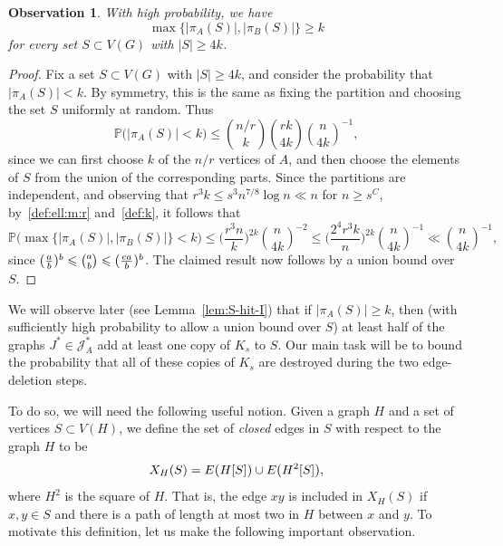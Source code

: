 \documentclass[10pt,a4paper]{amsart}
\newcommand\pig[1]{\scalerel*[5pt]{\normalsize#1}{%
  \ensurestackMath{\addstackgap[0.5pt]{\normalsize#1}}}}
\newtheorem{observation}[theorem]{Observation}
\numberwithin{theorem}{section}
\renewcommand{\(}{\bigl(}
\renewcommand{\)}{\bigr)\vphantom{)}}
\renewcommand{\leq}{\le}
\newcommand{\cJ}{\mathcal J}
\renewcommand{\le}{\leqslant}
\renewcommand{\ge}{\geqslant}
\renewcommand{\Pr}{\mathbb{P}}
\begin{document}
\begin{observation}\label{lem:partition-property}
With high probability, we have 
\begin{equation} 
\max\big\{ |\pi_A(S)|,  |\pi_B(S)| \big\} \ge k
\end{equation}
for every set $S \subset V(G)$ with $|S| \ge 4k$.
\end{observation}

\begin{proof}
Fix a set $S \subset V(G)$ with $|S| \ge 4k$, and consider the probability that $|\pi_A(S)| < k$. By symmetry, this is the same as fixing the partition and choosing the set $S$ uniformly at random. Thus
$$\Pr\big( |\pi_A(S)| < k \big) \le \binom{n/r}{k}\binom{rk}{4k} \binom{n}{4k}^{-1},$$
since we can first choose $k$ of the $n/r$ vertices of $A$, and then choose the elements of $S$ from the union of the corresponding parts. Since the partitions are independent, and observing that $r^3 k \le s^3 n^{7/8} \log n \ll n$ for $n \ge s^C$, by~\eqref{def:ell:m:r} and~\eqref{def:k},  
it follows that
$$\Pr\Big( \max\big\{ |\pi_A(S)|,  |\pi_B(S)|\big\} < k \Big) \le \bigg(\frac{r^3 n}{k} \bigg)^{2k} \binom{n}{4k}^{-2} \le \bigg(\frac{2^4 r^3 k}{n} \bigg)^{2k} \binom{n}{4k}^{-1} \ll \binom{n}{4k}^{-1},$$
since $\pig( \frac{a}{b} \pig)^b \leq {a \choose b} \leq \pig( \frac{ea}{b} \pig)^b$. The claimed result now follows by a union bound over $S$.
\end{proof}

We will observe later (see Lemma~\ref{lem:S-hit-I}) that if $|\pi_A(S)| \ge k$, then (with sufficiently high probability to allow a union bound over $S$) at least half of the graphs $J^* \in \cJ^*_A$ add at least one copy of $K_s$ to $S$. Our main task will be to bound the probability that all of these copies of $K_s$ are destroyed during the two edge-deletion steps. 

To do so, we will need the following useful notion. Given a graph $H$ and a set of vertices $S \subset V(H)$, we define the set of \emph{closed} edges in $S$ with respect to the graph $H$ to be
\begin{equation}\label{def:closed}
X_H(S) = E\pig( H[S] \pig) \cup E\pig( H^2[S] \pig),
\end{equation}
where $H^2$ is the square of $H$. That is, the edge $xy$ is included in $X_H(S)$ if $x,y \in S$ and there is a path of length at most two in $H$ between $x$ and $y$. To motivate this definition, let us make the following important observation. 
\end{document}
